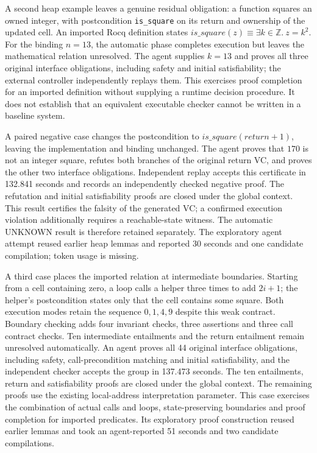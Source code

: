A second heap example leaves a genuine residual obligation: a function squares
an owned integer, with postcondition \texttt{is\_square} on its return and
ownership of the updated cell. An imported Rocq definition states
$\mathit{is\_square}(z)\equiv\exists k\in\mathbb{Z}.\ z=k^2$.
For the binding $n=13$, the automatic phase completes execution but leaves
the mathematical relation unresolved. The agent supplies $k=13$ and proves
all three original interface obligations, including safety and initial
satisfiability; the external controller independently replays them.
This exercises proof completion for an imported definition without supplying
a runtime decision procedure. It does not establish that an equivalent
executable checker cannot be written in a baseline system.

A paired negative case changes the postcondition to
$\mathit{is\_square}(\mathit{return}+1)$, leaving the implementation and
binding unchanged. The agent proves that $170$ is not an integer square,
refutes both branches of the original return VC, and proves the other two
interface obligations. Independent replay accepts this certificate in
132.841 seconds and records an independently checked negative proof. The refutation and initial
satisfiability proofs are closed under the global context. This result certifies
the falsity of the generated VC; a confirmed execution violation additionally
requires a reachable-state witness. The automatic UNKNOWN result is therefore
retained separately. The exploratory agent attempt reused earlier heap lemmas
and reported 30 seconds and one candidate compilation; token usage is missing.

A third case places the imported relation at intermediate boundaries. Starting
from a cell containing zero, a loop calls a helper three times to add $2i+1$;
the helper's postcondition states only that the cell contains some square.
Both execution modes retain the sequence $0,1,4,9$ despite this weak contract.
Boundary checking adds four invariant checks, three assertions and three call
contract checks. Ten intermediate entailments and the return entailment remain
unresolved automatically. An agent proves all 44 original interface obligations,
including safety, call-precondition matching and initial satisfiability, and
the independent checker accepts the group in 137.473 seconds. The ten
entailments, return and satisfiability proofs are closed under the global
context. The remaining proofs use the existing local-address interpretation
parameter. This case exercises the combination of actual calls and loops,
state-preserving boundaries and proof completion for imported predicates.
Its exploratory proof construction reused earlier lemmas and took an
agent-reported 51 seconds and two candidate compilations.


